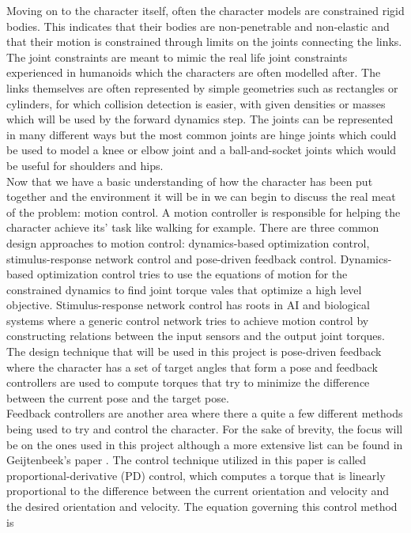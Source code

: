 \documentclass[12pt, a4paper]{article}
\begin{document}
Moving on to the character itself, often the character models are constrained rigid bodies. This indicates that their bodies are non-penetrable and non-elastic and that their motion is constrained through limits on the joints connecting the links. 
The joint constraints are meant to mimic the real life joint constraints experienced in humanoids which the characters are often modelled after. The links themselves are often represented by simple geometries such as rectangles or cylinders, for which collision detection is easier, with given densities or masses which will be used by the forward dynamics step. The joints can be represented in many different ways but the most common joints are hinge joints which could be used to model a knee or elbow joint and a ball-and-socket joints which would be useful for shoulders and hips.\\

Now that we have a basic understanding of how the character has been put together and the environment it will be in we can begin to discuss the real meat of the problem: motion control. A motion controller is responsible for helping the character achieve its' task like walking for example. There are three common design approaches to motion control: dynamics-based optimization control, stimulus-response network control and pose-driven feedback control. Dynamics-based optimization control tries to use the equations of motion for the constrained dynamics to find joint torque vales that optimize a high level objective. Stimulus-response network control has roots in AI and biological systems where a generic control network tries to achieve motion control by constructing relations between the input sensors and the output joint torques. The design technique that will be used in this project is pose-driven feedback where the character has a set of target angles that form a pose and feedback controllers are used to compute torques that try to minimize the difference between the current pose and the target pose. \\

Feedback controllers are another area where there a quite a few different methods being used to try and control the character. For the sake of brevity, the focus will be on the ones used in this project although a more extensive list can be found in Geijtenbeek's paper \cite{Geijtenbeek}. The control technique utilized in this paper is called proportional-derivative (PD) control, which computes a torque that is linearly proportional to the difference between the current orientation and velocity and the desired orientation and velocity. The equation governing  this control method is 
\end{document}
